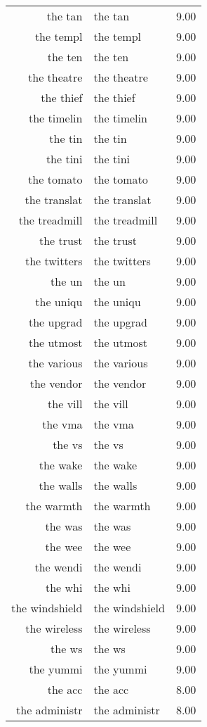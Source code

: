 \begin{table}[ht]
\begin{tabular}{rlr}
  the tan & the tan & 9.00 \\ 
  the templ & the templ & 9.00 \\ 
  the ten & the ten & 9.00 \\ 
  the theatre & the theatre & 9.00 \\ 
  the thief & the thief & 9.00 \\ 
  the timelin & the timelin & 9.00 \\ 
  the tin & the tin & 9.00 \\ 
  the tini & the tini & 9.00 \\ 
  the tomato & the tomato & 9.00 \\ 
  the translat & the translat & 9.00 \\ 
  the treadmill & the treadmill & 9.00 \\ 
  the trust & the trust & 9.00 \\ 
  the twitters & the twitters & 9.00 \\ 
  the un & the un & 9.00 \\ 
  the uniqu & the uniqu & 9.00 \\ 
  the upgrad & the upgrad & 9.00 \\ 
  the utmost & the utmost & 9.00 \\ 
  the various & the various & 9.00 \\ 
  the vendor & the vendor & 9.00 \\ 
  the vill & the vill & 9.00 \\ 
  the vma & the vma & 9.00 \\ 
  the vs & the vs & 9.00 \\ 
  the wake & the wake & 9.00 \\ 
  the walls & the walls & 9.00 \\ 
  the warmth & the warmth & 9.00 \\ 
  the was & the was & 9.00 \\ 
  the wee & the wee & 9.00 \\ 
  the wendi & the wendi & 9.00 \\ 
  the whi & the whi & 9.00 \\ 
  the windshield & the windshield & 9.00 \\ 
  the wireless & the wireless & 9.00 \\ 
  the ws & the ws & 9.00 \\ 
  the yummi & the yummi & 9.00 \\ 
  the acc & the acc & 8.00 \\ 
  the administr & the administr & 8.00 \\ 

\end{tabular}
\end{table}
